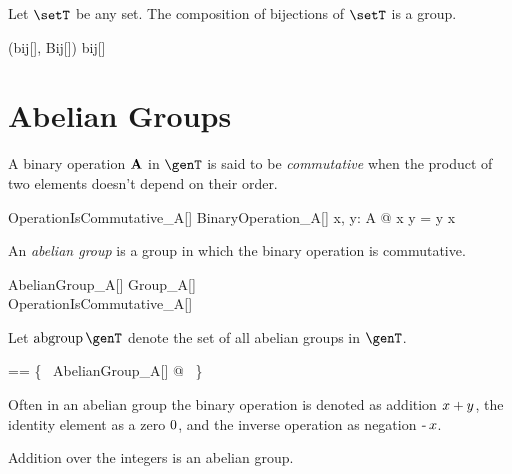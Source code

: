 \documentclass{amsart}
\begin{document}
\begin{example}
Let $\setT$ be any set.
The composition of bijections of $\setT$ is a group.

\begin{zed}
(bij[\setT], Bij[\setT]) \in \group bij[\setT]
\end{zed}

\end{example}

\section{Abelian Groups}

A binary operation $\mathbf{A}$ in $\genT$ is said to be {\em commutative} when the product of two elements doesn't depend on 
their order.
\begin{schema}{OperationIsCommutative\_A}[\genT]
	BinaryOperation\_A[\genT]
\where
	\forall x, y: A @ x \mulA y = y \mulA x
\end{schema}

An {\em abelian group} is a group in which the binary operation is commutative.
\begin{schema}{AbelianGroup\_A}[\genT]
	Group\_A[\genT] \\
	OperationIsCommutative\_A[\genT]
\end{schema}

Let $\abgroup \genT$ denote the set of all abelian groups in $\genT$.
\begin{zed}
	\abgroup \genT == \{~ AbelianGroup\_A[\genT] @ \strucA ~\}
\end{zed}

Often in an abelian group the binary operation is denoted as addition $x \mathbin{+} y$,
the identity element as a zero $0$, and the inverse operation as negation $\operatorname{-} x$.

\begin{example}
Addition over the integers is an abelian group.

\begin{zed}
	(\num, (\_ + \_)) \in \abgroup \num
\end{zed}

\end{example}

\printbibliography
\end{document}

